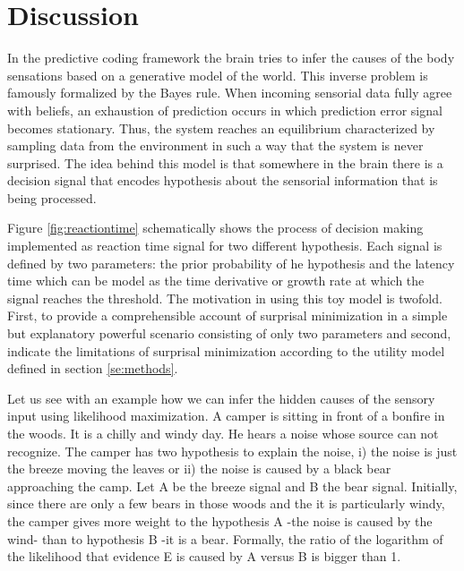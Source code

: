 \documentclass[11pt,twocolumn]{article}
\begin{document}
\section{Discussion}
\label{se:dis}

In the predictive coding framework the brain tries to infer the causes of the body sensations based on a generative model of the world. This inverse problem is famously formalized by the Bayes rule. When incoming sensorial data fully agree with beliefs, an exhaustion of prediction occurs in which prediction error signal becomes stationary. Thus, the system reaches an equilibrium characterized by sampling data from the environment in such a way that the system is never surprised. The idea behind this model is that somewhere in the brain there is a decision signal that encodes hypothesis about the sensorial information that is being processed. 

Figure \ref{fig:reactiontime} schematically shows the process of decision making implemented as reaction time signal for two different hypothesis. Each signal is defined by two parameters: the prior probability of he hypothesis and the latency time which can be model as the time derivative or growth rate at which the signal reaches the threshold. 
The motivation in using this toy model is twofold. First, to provide a comprehensible account of surprisal minimization in a simple but explanatory powerful scenario consisting of only two parameters and second, indicate the limitations of surprisal minimization according to the utility model defined in section \ref{se:methods}.


Let us see with an example how we can infer the hidden causes of the sensory input using likelihood maximization. A camper is sitting in front of a bonfire in the woods. It is a chilly and windy day. He hears a noise whose source can not recognize. The camper has two hypothesis to explain the noise, i) the noise is just the breeze moving the leaves or ii) the noise is caused by a black bear approaching the camp. Let A be the breeze signal and B the bear signal. Initially, since there are only a few bears in those woods and the it is particularly windy, the camper gives more weight to the hypothesis A -the noise is caused by the wind- than to hypothesis B -it is a bear. Formally, the ratio of the logarithm of the likelihood that evidence E is caused by A versus B is bigger than 1. 
\end{document}
